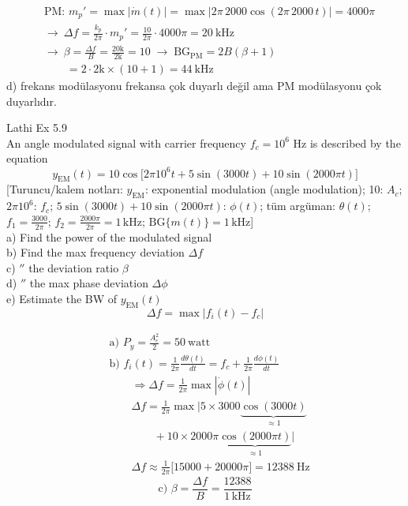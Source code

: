\documentclass[11pt,a4paper]{article}
\begin{document}
\begin{align*}
&\text{PM: }m_p'=\max|\dot m(t)|=\max|2\pi\,2000\cos(2\pi\,2000\,t)|=4000\pi\\
&\to\ \Delta f=\frac{k_p}{2\pi}\cdot m_p'=\frac{10}{2\pi}\cdot4000\pi=20\ \mathrm{kHz}\\
&\to\ \beta=\frac{\Delta f}{B}=\frac{20\mathrm{k}}{2\mathrm{k}}=10\;\to\;\mathrm{BG}_{\mathrm{PM}}=2B(\beta+1)\\
&\qquad=2\cdot2\mathrm{k}\times(10+1)=44\ \mathrm{kHz}
\end{align*}
d) frekans modülasyonu frekansa çok duyarlı değil ama PM modülasyonu çok duyarlıdır.

\begin{ornek}
Lathi Ex 5.9\\
An angle modulated signal with carrier frequency $f_c=10^6$ Hz is described by the equation
\[ y_{\mathrm{EM}}(t)=10\cos\big[2\pi10^6 t+5\sin(3000t)+10\sin(2000\pi t)\big] \]
[Turuncu/kalem notları: $y_{\mathrm{EM}}$: exponential modulation (angle modulation); 10: $A_c$; $2\pi10^6$: $f_c$; $5\sin(3000t)+10\sin(2000\pi t)$: $\phi(t)$; tüm argüman: $\theta(t)$; $f_1=\frac{3000}{2\pi}$; $f_2=\frac{2000\pi}{2\pi}=1\,\mathrm{kHz}$; $\mathrm{BG}\{m(t)\}=1\,\mathrm{kHz}$]\\
a) Find the power of the modulated signal\\
b) Find the max frequency deviation $\Delta f$\\
c) $''$ the deviation ratio $\beta$\\
d) $''$ the max phase deviation $\Delta\phi$\\
e) Estimate the BW of $y_{\mathrm{EM}}(t)$
\[ \Delta f=\max|f_i(t)-f_c| \]
\end{ornek}
\begin{align*}
&\text{a) }P_y=\frac{A_c^2}{2}=50\ \text{watt}\\
&\text{b) }f_i(t)=\frac{1}{2\pi}\frac{d\theta(t)}{dt}=f_c+\frac{1}{2\pi}\frac{d\phi(t)}{dt}\\
&\qquad\Rightarrow\Delta f=\frac{1}{2\pi}\max|\dot\phi(t)|\\
&\qquad\Delta f=\frac{1}{2\pi}\max\Big|5\times3000\underbrace{\cos(3000t)}_{\approx1}\\
&\qquad\qquad+10\times2000\pi\underbrace{\cos(2000\pi t)}_{\approx1}\Big|\\
&\qquad\Delta f\approx\frac{1}{2\pi}\big[15000+20000\pi\big]=12388\ \mathrm{Hz}
\end{align*}
\[ \text{c) }\beta=\frac{\Delta f}{B}=\frac{12388}{1\,\mathrm{kHz}} \]
\end{document}
